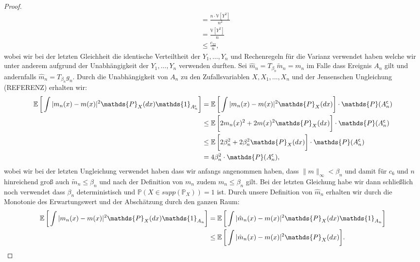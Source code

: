 \begin{proof}
\begin{equation}
\begin{split}
& = \frac{n \cdot  \mathds{V}[Y^2]}{n^2} \\
& = \frac{\mathds{V}[Y^2]}{n} \\
& \leq \frac{c_{22}}{n},
\end{split}
\end{equation}
wobei wir bei der letzten Gleichheit die identische Verteiltheit der $Y_1,\dots,Y_n$ und Rechenregeln für die Varianz verwendet haben welche wir unter anderem aufgrund der Unabhängigkeit der $Y_1,\dots,Y_n$ verwenden durften.
Sei $\hat{m}_n = T_{\beta_n}\tilde{m}_n = m_n$ im Falle dass Ereignis $A_n$ gilt und andernfalls $\hat{m}_n = T_{\beta_n}g_n$. Durch die Unabhängigkeit von $A_n$ zu den Zufallsvariablen $X, X_1, \dots, X_n$ und der Jensenschen Ungleichung (REFERENZ) erhalten wir$\colon$
\begin{equation}
\label{anc}
\begin{split}
 \E \bigg[\int |m_n(x) - m(x)|^2 \mathds{P}_X(dx) \mathds{1}_{A_n^{\mathsf{c}}}\bigg] & =  \E \bigg[\int |m_n(x) - m(x)|^2 \mathds{P}_X(dx) \bigg] \cdot \mathds{P}(A_n^{\mathsf{c}}) \\
 & \leq \E \bigg[2m_n(x)^2 + 2m(x)^2 \mathds{P}_X(dx)\bigg] \cdot \mathds{P}(A_n^{\mathsf{c}})\\
 & \leq \E \bigg[2\beta_n^2 + 2\beta_n^2 \mathds{P}_X(dx)\bigg] \cdot \mathds{P}(A_n^{\mathsf{c}})\\
 & = 4\beta_n^2 \cdot \mathds{P}(A_n^{\mathsf{c}}),
\end{split}
\end{equation}
wobei wir bei der letzten Ungleichung verwendet haben dass wir anfangs angenommen haben, dass $\|m\|_{\infty} < \beta_n$ und damit für $c_6$ und $n$ hinreichend groß auch $\tilde{m}_n \leq \beta_n$ und nach der Definition von $m_n$ zudem $m_n \leq \beta_n$ gilt. Bei der letzten Gleichung habe wir dann schließlich noch verwendet dass $\beta_n$ deterministisch und $\mathds{P}(X \in supp(\mathds{P}_X)) = 1$ ist.
Durch unsere Definition von $\hat{m}_n$ erhalten wir durch die Monotonie des Erwartungswert und der Abschätzung durch den ganzen Raum$\colon$
\begin{equation}
\label{an}
\begin{split}
\E \bigg[\int |m_n(x) - m(x)|^2 \mathds{P}_X(dx) \mathds{1}_{A_n}\bigg] & = \E \bigg[\int |\hat{m}_n(x) - m(x)|^2 \mathds{P}_X(dx) \mathds{1}_{A_n}\bigg] \\
& \leq \E \bigg[\int |\hat{m}_n(x) - m(x)|^2 \mathds{P}_X(dx)\bigg].
\end{split}
\end{equation}

\end{proof}
